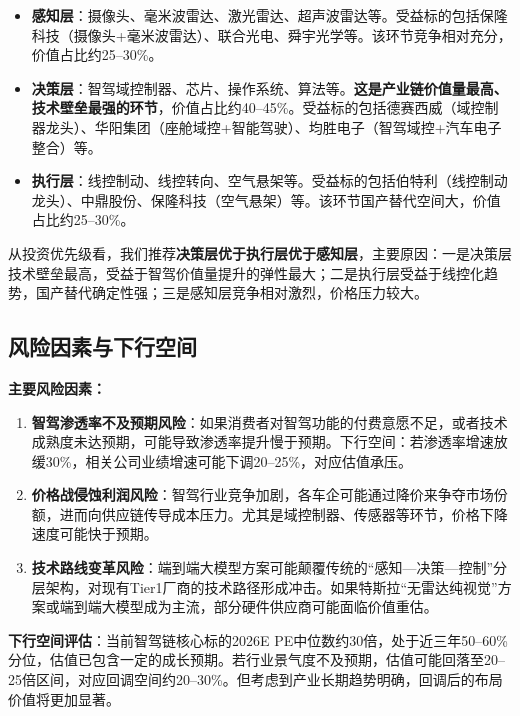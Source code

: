 \begin{itemize}[leftmargin=2em]
\item \textbf{感知层}：摄像头、毫米波雷达、激光雷达、超声波雷达等。受益标的包括保隆科技（摄像头+毫米波雷达）、联合光电、舜宇光学等。该环节竞争相对充分，价值占比约25--30\%。
\item \textbf{决策层}：智驾域控制器、芯片、操作系统、算法等。\textbf{这是产业链价值量最高、技术壁垒最强的环节}，价值占比约40--45\%。受益标的包括德赛西威（域控制器龙头）、华阳集团（座舱域控+智能驾驶）、均胜电子（智驾域控+汽车电子整合）等。
\item \textbf{执行层}：线控制动、线控转向、空气悬架等。受益标的包括伯特利（线控制动龙头）、中鼎股份、保隆科技（空气悬架）等。该环节国产替代空间大，价值占比约25--30\%。
\end{itemize}

从投资优先级看，我们推荐\textbf{决策层优于执行层优于感知层}，主要原因：一是决策层技术壁垒最高，受益于智驾价值量提升的弹性最大；二是执行层受益于线控化趋势，国产替代确定性强；三是感知层竞争相对激烈，价格压力较大。

\subsection{风险因素与下行空间}

\textbf{主要风险因素：}

\begin{enumerate}[leftmargin=2em]
\item \textbf{智驾渗透率不及预期风险}：如果消费者对智驾功能的付费意愿不足，或者技术成熟度未达预期，可能导致渗透率提升慢于预期。下行空间：若渗透率增速放缓30\%，相关公司业绩增速可能下调20--25\%，对应估值承压。

\item \textbf{价格战侵蚀利润风险}：智驾行业竞争加剧，各车企可能通过降价来争夺市场份额，进而向供应链传导成本压力。尤其是域控制器、传感器等环节，价格下降速度可能快于预期。

\item \textbf{技术路线变革风险}：端到端大模型方案可能颠覆传统的“感知---决策---控制”分层架构，对现有Tier1厂商的技术路径形成冲击。如果特斯拉“无雷达纯视觉”方案或端到端大模型成为主流，部分硬件供应商可能面临价值重估。
\end{enumerate}

\textbf{下行空间评估}：当前智驾链核心标的2026E PE中位数约30倍，处于近三年50--60\%分位，估值已包含一定的成长预期。若行业景气度不及预期，估值可能回落至20--25倍区间，对应回调空间约20--30\%。但考虑到产业长期趋势明确，回调后的布局价值将更加显著。

